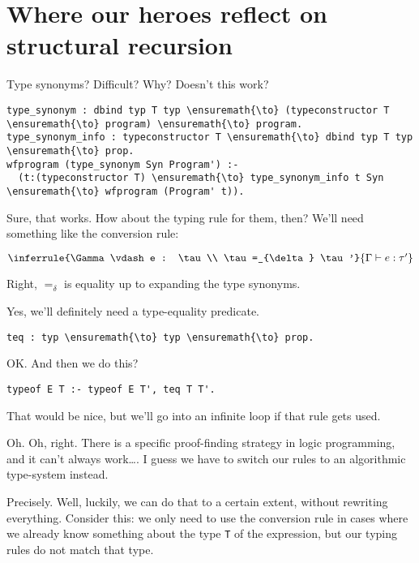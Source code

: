 \section{Where our heroes reflect on structural
recursion}\label{where-our-heroes-reflect-on-structural-recursion}

\heroSTUDENT{} Type synonyms? Difficult? Why? Doesn't this work?

\begin{verbatim}
type_synonym : dbind typ T typ \ensuremath{\to} (typeconstructor T \ensuremath{\to} program) \ensuremath{\to} program.
type_synonym_info : typeconstructor T \ensuremath{\to} dbind typ T typ \ensuremath{\to} prop.
wfprogram (type_synonym Syn Program') :-
  (t:(typeconstructor T) \ensuremath{\to} type_synonym_info t Syn \ensuremath{\to} wfprogram (Program' t)).
\end{verbatim}

\heroADVISOR{} Sure, that works. How about the typing rule for them, then?
We'll need something like the conversion rule:

\begin{center}$\inferrule{\Gamma \vdash e : \tau \\ \tau =_{\delta} \tau'}{\Gamma \vdash e : \tau'}$\end{center}

\heroSTUDENT{} Right, \(=_{\delta}\) is equality up to expanding the type
synonyms.

\heroADVISOR{} Yes, we'll definitely need a type-equality predicate.

\begin{verbatim}
teq : typ \ensuremath{\to} typ \ensuremath{\to} prop.
\end{verbatim}

\heroSTUDENT{} OK. And then we do this?

\begin{verbatim}
typeof E T :- typeof E T', teq T T'.
\end{verbatim}

\heroADVISOR{} That would be nice, but we'll go into an infinite loop if that
rule gets used.

\heroSTUDENT{} Oh. Oh, right. There is a specific proof-finding strategy in
logic programming, and it can't always work\ldots{}. I guess we have to
switch our rules to an algorithmic type-system instead.

\heroADVISOR{} Precisely. Well, luckily, we can do that to a certain extent,
without rewriting everything. Consider this: we only need to use the
conversion rule in cases where we already know something about the type
\texttt{T} of the expression, but our typing rules do not match that
type.

